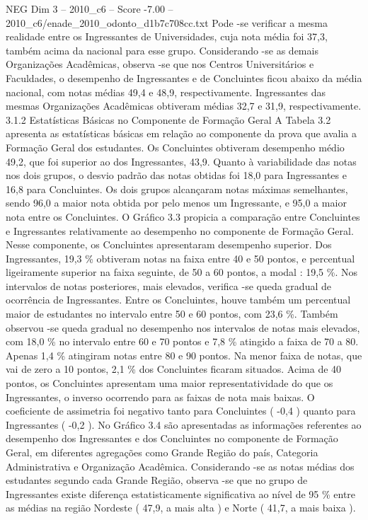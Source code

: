 \begin{textsample}{NEG Dim 3 – 2010\_c6 – Score -7.00 – 2010\_c6/enade\_2010\_odonto\_d1b7c708cc.txt}
Pode -se verificar a mesma realidade entre os Ingressantes de Universidades, cuja nota média foi 37,3, também acima da nacional para esse grupo.
Considerando -se as demais Organizações Acadêmicas, observa -se que nos Centros Universitários e Faculdades, o desempenho de Ingressantes e de Concluintes ficou abaixo da média nacional, com notas médias 49,4 e 48,9, respectivamente.
Ingressantes das mesmas Organizações Acadêmicas obtiveram médias 32,7 e 31,9, respectivamente. 3.1.2 Estatísticas Básicas no Componente de Formação Geral A Tabela 3.2 apresenta as estatísticas básicas em relação ao componente da prova que avalia a Formação Geral dos estudantes.
Os Concluintes obtiveram desempenho médio 49,2, que foi superior ao dos Ingressantes, 43,9.
Quanto à variabilidade das notas nos dois grupos, o desvio padrão das notas obtidas foi 18,0 para Ingressantes e 16,8 para Concluintes.
Os dois grupos alcançaram notas máximas semelhantes, sendo 96,0 a maior nota obtida por pelo menos um Ingressante, e 95,0 a maior nota entre os Concluintes.
O Gráfico 3.3 propicia a comparação entre Concluintes e Ingressantes relativamente ao desempenho no componente de Formação Geral.
Nesse componente, os Concluintes apresentaram desempenho superior.
Dos Ingressantes, 19,3 \% obtiveram notas na faixa entre 40 e 50 pontos, e percentual ligeiramente superior na faixa seguinte, de 50 a 60 pontos, a modal : 19,5 \%.
Nos intervalos de notas posteriores, mais elevados, verifica -se queda gradual de ocorrência de Ingressantes.
Entre os Concluintes, houve também um percentual maior de estudantes no intervalo entre 50 e 60 pontos, com 23,6 \%.
Também observou -se queda gradual no desempenho nos intervalos de notas mais elevados, com 18,0 \% no intervalo entre 60 e 70 pontos e 7,8 \% atingido a faixa de 70 a 80.
Apenas 1,4 \% atingiram notas entre 80 e 90 pontos.
Na menor faixa de notas, que vai de zero a 10 pontos, 2,1 \% dos Concluintes ficaram situados.
Acima de 40 pontos, os Concluintes apresentam uma maior representatividade do que os Ingressantes, o inverso ocorrendo para as faixas de nota mais baixas.
O coeficiente de assimetria foi negativo tanto para Concluintes ( -0,4 ) quanto para Ingressantes ( -0,2 ).
No Gráfico 3.4 são apresentadas as informações referentes ao desempenho dos Ingressantes e dos Concluintes no componente de Formação Geral, em diferentes agregações como Grande Região do país, Categoria Administrativa e Organização Acadêmica.
Considerando -se as notas médias dos estudantes segundo cada Grande Região, observa -se que no grupo de Ingressantes existe diferença estatisticamente significativa ao nível de 95 \% entre as médias na região Nordeste ( 47,9, a mais alta ) e Norte ( 41,7, a mais baixa ).

\end{textsample}
